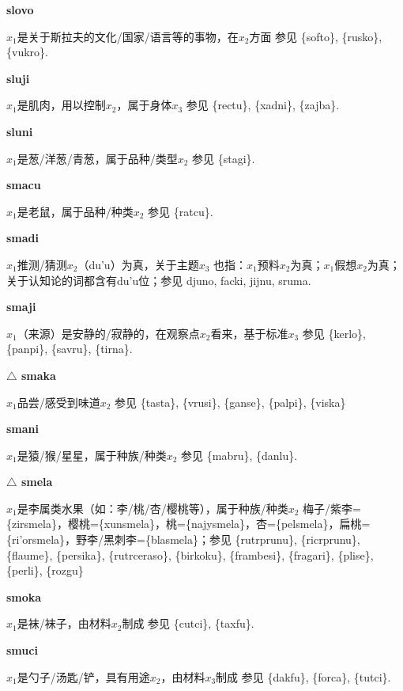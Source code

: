 \documentclass[notitlepage,twocolumn,a4paper,10pt]{book}
\begin{document}
{\sffamily\bfseries slovo}\enspace {\ttfamily\bfseries[lov     lo'o]}  $x_1$是关于斯拉夫的文化\slash{}国家\slash{}语言等的事物，在$x_2$方面 \textemdash{} 参见 \{softo\}, \{rusko\}, \{vukro\}.

{\sffamily\bfseries sluji}\enspace {\ttfamily\bfseries[    slu]}  $x_1$是肌肉，用以控制$x_2$，属于身体$x_3$ \textemdash{} 参见 \{rectu\}, \{xadni\}, \{zajba\}.

{\sffamily\bfseries sluni} $x_1$是葱\slash{}洋葱\slash{}青葱，属于品种\slash{}类型$x_2$ \textemdash{} 参见 \{stagi\}.

{\sffamily\bfseries smacu} $x_1$是老鼠，属于品种\slash{}种类$x_2$ \textemdash{} 参见 \{ratcu\}.

{\sffamily\bfseries smadi} $x_1$推测\slash{}猜测$x_2$（du'u）为真，关于主题$x_3$ \textemdash{} 也指：$x_1$预料$x_2$为真；$x_1$假想$x_2$为真；关于认知论的词都含有du'u位；参见 {djuno}, {facki}, {jijnu}, {sruma}.

{\sffamily\bfseries smaji}\enspace {\ttfamily\bfseries[    sma]}  $x_1$（来源）是安静的\slash{}寂静的，在观察点$x_2$看来，基于标准$x_3$ \textemdash{} 参见 \{kerlo\}, \{panpi\}, \{savru\}, \{tirna\}.

{\sffamily\bfseries $\triangle$ smaka} $x_1$品尝\slash{}感受到味道$x_2$ \textemdash{} 参见 \{tasta\}, \{vrusi\}, \{ganse\}, \{palpi\}, \{viska\}

{\sffamily\bfseries smani} $x_1$是猿\slash{}猴\slash{}星星，属于种族\slash{}种类$x_2$ \textemdash{} 参见 \{mabru\}, \{danlu\}.

{\sffamily\bfseries $\triangle$ smela} $x_1$是李属类水果（如：李\slash{}桃\slash{}杏\slash{}樱桃等），属于种族\slash{}种类$x_2$ \textemdash{} 梅子\slash{}紫李=\{zirsmela\}，樱桃=\{xunsmela\}，桃=\{najysmela\}，杏=\{pelsmela\}，扁桃=\{ri'orsmela\}，野李\slash{}黑刺李=\{blasmela\}；参见 \{rutrprunu\}, \{ricrprunu\}, \{flaume\}, \{persika\}, \{rutrceraso\}, \{birkoku\}, \{frambesi\}, \{fragari\}, \{plise\}, \{perli\}, \{rozgu\}

{\sffamily\bfseries smoka}\enspace {\ttfamily\bfseries[    smo]}  $x_1$是袜\slash{}袜子，由材料$x_2$制成 \textemdash{} 参见 \{cutci\}, \{taxfu\}.

{\sffamily\bfseries smuci}\enspace {\ttfamily\bfseries[muc]}  $x_1$是勺子\slash{}汤匙\slash{}铲，具有用途$x_2$，由材料$x_3$制成 \textemdash{} 参见 \{dakfu\}, \{forca\}, \{tutci\}.
\end{document}
